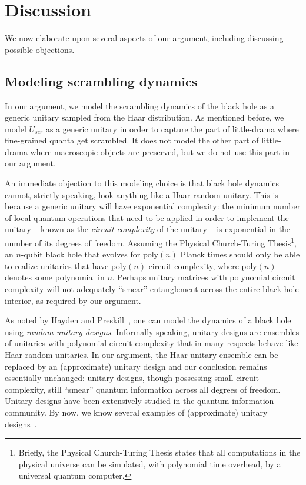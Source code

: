 \documentclass[a4paper,11pt]{article}
\theoremstyle{definition}
\begin{document}
\section{Discussion}
\label{Sec:Discussion}

We now elaborate upon several aspects of our argument, including discussing possible objections.


\subsection{Modeling scrambling dynamics}
\label{Sec:scrambling_model}
In our argument, we model the scrambling dynamics of the black hole as a generic unitary sampled from the Haar distribution. As mentioned before, we model $U_{scr}$ as a generic unitary in order to capture the part of little-drama where fine-grained quanta get scrambled. It does not model the other part of little-drama where macroscopic objects are preserved, but we do not use this part in our argument. 

An immediate objection to this modeling choice is that black hole dynamics cannot, strictly speaking, look anything like a Haar-random unitary. This is because a generic unitary will have exponential complexity: the minimum number of local quantum operations that need to be applied in order to implement the unitary -- known as the \emph{circuit complexity} of the unitary -- is exponential in the number of its degrees of freedom. Assuming the Physical Church-Turing Thesis\footnote{Briefly, the Physical Church-Turing Thesis states that all computations in the physical universe can be simulated, with polynomial time overhead, by a universal quantum computer.}, an $n$-qubit black hole that evolves for $\mathrm{poly}(n)$ Planck times should only be able to realize unitaries that have $\mathrm{poly}(n)$ circuit complexity, where $\mathrm{poly}(n)$ denotes some polynomial in $n$. Perhaps unitary matrices with polynomial circuit complexity will not adequately ``smear'' entanglement across the entire black hole interior, as required by our argument. 

As noted by Hayden and Preskill~\cite{Hayden:2007cs}, one can model the dynamics of a black hole using \emph{random unitary designs}. Informally speaking, unitary designs are ensembles of unitaries with polynomial circuit complexity that in many respects behave like Haar-random unitaries. In our argument, the Haar unitary ensemble can be replaced by an (approximate) unitary design and our conclusion remains essentially unchanged: unitary designs, though possessing small circuit complexity, still ``smear'' quantum information across all degrees of freedom. Unitary designs have been extensively studied in the quantum information community. By now, we know several examples of (approximate) unitary designs~\cite{brandao2012local,dankert2009exact}.
\end{document}
